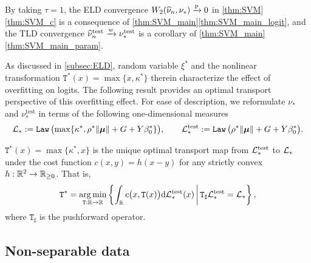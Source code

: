 \begin{rem}
    By taking $\tau = 1$, the ELD convergence $W_2(\widehat{\nu}_n , \nu_* ) \xrightarrow{\mathrm{p}} 0$ in \cref{thm:SVM}\ref{thm:SVM_c} is a consequence of \cref{thm:SVM_main}\ref{thm:SVM_main_logit}, and the TLD convergence $\widehat{\nu}_n^\mathrm{test} \xrightarrow{w} \nu^\mathrm{test}_*$ is a corollary of \cref{thm:SVM_main}\ref{thm:SVM_main_param}.
\end{rem}

As discussed in \cref{subsec:ELD}, random variable $\xi^*$ and the nonlinear transformation $\mathtt{T}^*(x) = \max\{x, \kappa^*\}$ therein characterize the effect of overfitting on logits. The following result provides an optimal transport perspective of this overfitting effect. For ease of description, we reformulate $\nu_*$ and $\nu^\mathrm{test}_*$ in terms of the following one-dimensional measures
\begin{equation*}
    \mathcal{L}_*  := \mathtt{Law} \,\bigl(  \max\{ \kappa^*, \rho^* \| \text{\boldmath $\mu$} \| + G + Y \beta_0^* \} \bigr),  
        \qquad 
    \mathcal{L}^\mathrm{test}_* := \mathtt{Law} \,\bigl(  \rho^* \| \text{\boldmath $\mu$} \| + G + Y \beta_0^* \bigr).
\end{equation*}

\begin{prop}\label{prop:opt_transport}
    $\mathtt{T}^*(x) = \max\{\kappa^*, x\}$ is the unique optimal transport map from $\mathcal{L}_*^\mathrm{test}$ to $\mathcal{L}_*$ under the cost function $c(x, y) = h(x - y)$ for any strictly convex $h: \mathbb{R}^2 \to \mathbb{R}_{\ge 0}$. That is, 
    \[ 
    \mathtt{T}^* = \operatorname*{arg\,min}_{\mathtt{T}: \mathbb{R} \to \mathbb{R}} \left\{ \int_{\mathbb{R}} c \bigl( x, \mathtt{T}(x) \bigr)  \textup{d} \mathcal{L}_*^\mathrm{test}(x)
    \,\middle|\,
    \mathtt{T}_\sharp \mathcal{L}_*^\mathrm{test} = \mathcal{L}_*
    \right\},
    \]
    where $\mathtt{T}_\sharp$ is the pushforward operator.
\end{prop}














\subsection{Non-separable data}
\label{sec:logit_logistic}

